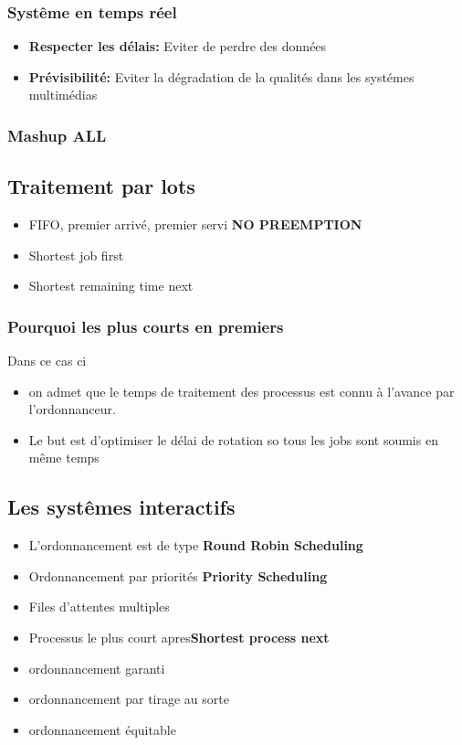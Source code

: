 \subsubsection{Systême en temps réel}
\begin{itemize}
    \item \textbf{Respecter les délais: }Eviter de perdre des données
    \item \textbf{Prévisibilité: }Eviter la dégradation de la qualités dans les systémes multimédias
\end{itemize}
\subsubsection{Mashup ALL}
\subsection{Traitement par lots}
\begin{itemize}
    \item FIFO, premier arrivé, premier servi \textbf{NO PREEMPTION}
    \item Shortest job first
    \item Shortest remaining time next
\end{itemize}

\subsubsection{Pourquoi les plus courts en premiers}
Dans ce cas ci
\begin{itemize}
    \item on admet que le temps de traitement des processus est connu à l'avance par l'ordonnanceur.
    \item Le but est d'optimiser le délai de rotation so tous les jobs sont soumis en même temps
\end{itemize}

\subsection{Les systêmes interactifs}
\begin{itemize}
    \item L'ordonnancement est de type \textbf{Round Robin Scheduling}
    \item Ordonnancement par priorités \textbf{Priority Scheduling}
    \item Files d'attentes multiples
    \item Processus le plus court apres\textbf{Shortest process next}
    \item ordonnancement garanti
    \item ordonnancement par tirage au sorte
    \item ordonnancement équitable
\end{itemize}

